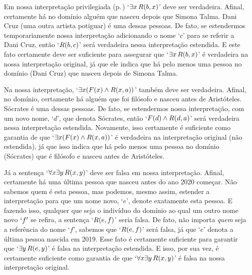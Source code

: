 Em nossa interpretação privilegiada (p.\,\pageref{i:Sample}) `$\exists x\, \mathord{R}(b,x)$' deve ser verdadeira. Afinal, certamente há no domínio alguém que nasceu depois que Simona Talma.
Dani Cruz (uma outra artista potiguar) é uma dessas pessoas.
De fato, se estendermos temporariamente nossa interpretação adicionando o nome `$c$' para se referir a Dani Cruz, então `$\mathord{R}(b,c)$' será verdadeira nessa interpretação estendida.
E este fato certamente deve ser suficiente para assegurar que `$\exists x\,\mathord{R}(b,x)$' é verdadeira na nossa interpretação original, já que ele indica que há pelo menos uma pessoa no domínio (Dani Cruz) que nasceu depois de Simona Talma.

Na nossa interpretação, `$\exists x (\mathord{F}(x) \wedge \mathord{R}(x,a))$' também deve ser verdadeira.
Afinal, no domínio, certamente há alguém que foi filósofo e nasceu antes de Aristóteles.
Sócrates é uma dessas pessoas.
De fato, se estendermos nossa interpretação, com um novo nome, `$d$', que denota Sócrates, então `$\mathord{F}(d) \wedge \mathord{R}(d,a)$' será verdadeira nessa interpretação estendida.
Novamente, isso certamente é suficiente como garantia de que `$\exists x (\mathord{F}(x) \wedge \mathord{R}(x,a))$' é verdadeira na interpretação original (não estendida), já que isso indica que há pelo menos uma pessoa no domínio (Sócrates) que é filósofo e nasceu antes de Aristóteles.

Já a sentença `$\forall x \exists y\, \mathord{R}(x,y)$' deve ser falsa em nossa interpretação.
Afinal, certamente há uma última pessoa que nasceu antes do ano 2020 começar.
Não sabemos quem é esta pessoa, mas podemos, mesmo assim, estender a interpretação para que um nome novo, `$e$', denote exatamente esta pessoa.
E fazendo isso, qualquer que seja o indivíduo do domínio ao qual um outro nome novo $`f'$ se refira, a sentença `$\mathord{R}(e,f)$' seria falsa.
De fato, não importa \emph{quem} seja a referência do nome `$f$', sabemos que `$\mathord{R}(e,f)$' será falsa, já que `$e$' denota a última pessoa nascida em 2019. 
Esse fato é certamente suficiente para garantir que `$\exists y\, \mathord{R}(e,y)$' é falsa na interpretação estendida. E isso, por sua vez, é certamente suficiente como garantia de que `$\forall x \exists y\, \mathord{R}(x,y)$' é falsa na nossa interpretação original.

